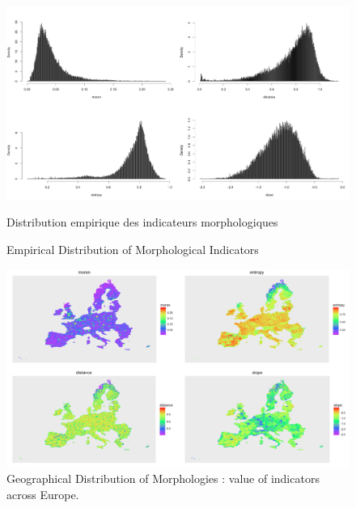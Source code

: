 \begin{figure}
\includegraphics[width=1.2\textwidth]{Figures/Static/Density/hists_GOOD}
\caption[Empirical Distribution of Morphological Indicators]{Empirical Distribution of Morphological Indicators}{Distribution empirique des indicateurs morphologiques}
\end{figure}

\begin{figure}
\hspace{-5cm}
\includegraphics[angle=90,width=1.7\textwidth,height=\textheight]{Figures/Static/Density/all_50km}
\caption[Geographical Distribution of Morphologies]{Geographical Distribution of Morphologies : value of indicators across Europe.}{}
\end{figure}


